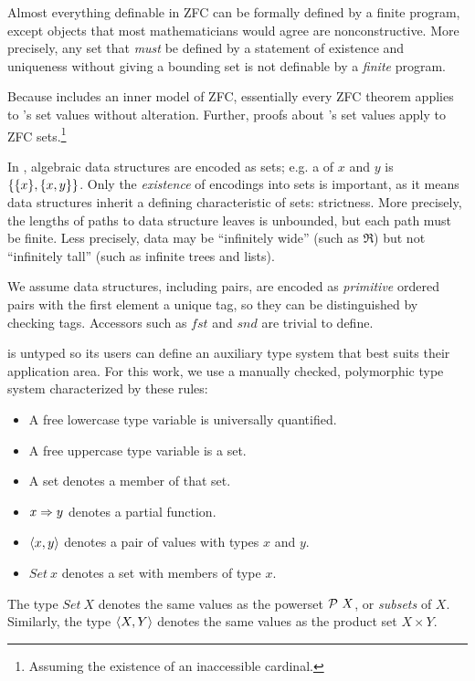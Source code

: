 \documentclass[preprint]{sigplanconf}
\begin{document}
Almost everything definable in ZFC can be formally defined by a finite \lzfclang program, except objects that most mathematicians would agree are nonconstructive.
More precisely, any set that \emph{must} be defined by a statement of existence and uniqueness without giving a bounding set is not definable by a \emph{finite} \lzfclang program.

Because \lzfclang includes an inner model of ZFC, essentially every ZFC theorem applies to \lzfclang's set values without alteration.
Further, proofs about \lzfclang's set values apply to ZFC sets.\footnote{Assuming the existence of an inaccessible cardinal.}

In \lzfclang, algebraic data structures are encoded as sets; e.g. a  of $x$ and $y$ is $\{{\{{x}\},\{{x,y}\}}\}$.
Only the \emph{existence} of encodings into sets is important, as it means data structures inherit a defining characteristic of sets: strictness.
More precisely, the lengths of paths to data structure leaves is unbounded, but each path must be finite.
Less precisely, data may be ``infinitely wide'' (such as $\Re$) but not ``infinitely tall'' (such as infinite trees and lists).

We assume data structures, including pairs, are encoded as \emph{primitive} ordered pairs with the first element a unique tag, so they can be distinguished by checking tags.
Accessors such as $fst$ and $snd$ are trivial to define.

\lzfclang is untyped so its users can define an auxiliary type system that best suits their application area.
For this work, we use a manually checked, polymorphic type system characterized by these rules:
\begin{itemize}
	\item A free lowercase type variable is universally quantified.
	\item A free uppercase type variable is a set.
	\item A set denotes a member of that set.
	\item $x \Rightarrow y$ denotes a partial function.
	\item $\langle{x,y}\rangle$ denotes a pair of values with types $x$ and $y$.
	\item $Set~x$ denotes a set with members of type $x$.
\end{itemize}
The type $Set~X$ denotes the same values as the powerset $\mathcal{P}~X$, or \emph{subsets} of $X$.
Similarly, the type $\langle{X,Y}\rangle$ denotes the same values as the product set $X \times Y$.
\end{document}
